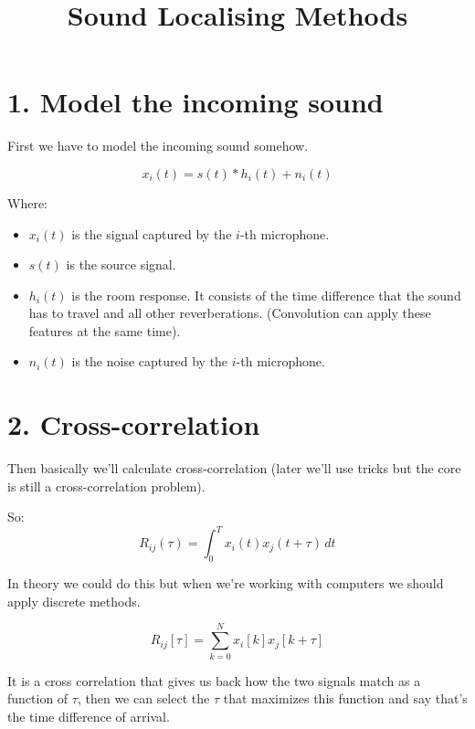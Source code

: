 \documentclass{article}
\title{Sound Localising Methods}
\date{}
\begin{document}
\maketitle

\section*{1. Model the incoming sound}

First we have to model the incoming sound somehow.

\begin{equation}
    x_i(t) = s(t) * h_i(t) + n_i(t)
\end{equation}

Where:
\begin{itemize}
    \item $x_i(t)$ is the signal captured by the $i$-th microphone.
    \item $s(t)$ is the source signal.
    \item $h_i(t)$ is the room response. It consists of the time difference that the sound has to travel and all other reverberations. (Convolution can apply these features at the same time).
    \item $n_i(t)$ is the noise captured by the $i$-th microphone.
\end{itemize}

\section*{2. Cross-correlation}

Then basically we'll calculate cross-correlation (later we'll use tricks but the core is still a cross-correlation problem).

So:
\begin{equation}
    R_{ij}(\tau) = \int_{0}^{T} x_i(t) x_j(t+\tau) \, dt
\end{equation}

In theory we could do this but when we're working with computers we should  apply discrete methods.

\begin{equation}
    R_{ij}[\tau] = \sum_{k=0}^{N} x_i[k] x_j[k+\tau]
\end{equation}

It is a cross correlation that gives us back how the two signals match as a function of $\tau$, then we can select the $\tau$ that maximizes this function and say that's the time difference of arrival.
\end{document}
